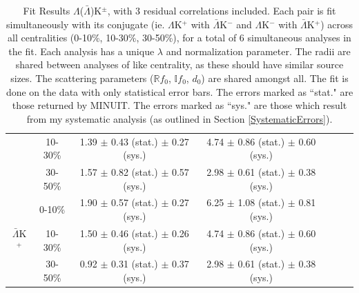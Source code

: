 \documentclass[../AnalysisNoteJBuxton.tex]{subfiles}
\begin{document}
\begin{landscape}
\begin{table}[htbp]
{\begin{tabular}{|c|c|c|c|c|c|c|}
   & 10-30\% & 1.39 $\pm$ 0.43 (stat.) $\pm$ 0.27 (sys.)  %
             & 4.74 $\pm$ 0.86 (stat.) $\pm$ 0.60 (sys.)  %
             & & & \\
             
   & 30-50\% & 1.57 $\pm$ 0.82 (stat.) $\pm$ 0.57 (sys.)  %
             & 2.98 $\pm$ 0.61 (stat.) $\pm$ 0.38 (sys.)  %
             & & & \\
  \cline{1-4}  
  \multirow{3}{*}{$\bar{\Lambda}$K$^{+}$}  
   &  0-10\% & 1.90 $\pm$ 0.57 (stat.) $\pm$ 0.27 (sys.)  %
             & 6.25 $\pm$ 1.08 (stat.) $\pm$ 0.81 (sys.)  %
             & & & \\
             
   & 10-30\% & 1.50 $\pm$ 0.46 (stat.) $\pm$ 0.26 (sys.)  %
             & 4.74 $\pm$ 0.86 (stat.) $\pm$ 0.60 (sys.)  %
             & & & \\
             
   & 30-50\% & 0.92 $\pm$ 0.31 (stat.) $\pm$ 0.37 (sys.)  %
             & 2.98 $\pm$ 0.61 (stat.) $\pm$ 0.38 (sys.)  %
             & & & \\
  \hline
 \end{tabular}}
 \caption{Fit Results $\Lambda$($\bar{\Lambda}$)K$^{\pm}$, with 3 residual correlations included.
 Each pair is fit simultaneously with its conjugate (ie. $\Lambda$K$^{+}$ with $\bar{\Lambda}$K$^{-}$ and $\Lambda$K$^{-}$ with $\bar{\Lambda}$K$^{+}$) across all centralities (0-10\%, 10-30\%, 30-50\%), for a total of 6 simultaneous analyses in the fit.
 Each analysis has a unique $\lambda$ and normalization parameter.
 The radii are shared between analyses of like centrality, as these should have similar source sizes.
 The scattering parameters ($\mathbb{R}f_{0}$, $\mathbb{I}f_{0}$, $d_{0}$) are shared amongst all.
 The fit is done on the data with only statistical error bars.
 The errors marked as ``stat." are those returned by MINUIT.
 The errors marked as ``sys." are those which result from my systematic analysis (as outlined in Section \ref{SystematicErrors}).}
 \label{tab:FitResultsLamKch_3Res}
\end{table}




\end{landscape}
\end{document}
